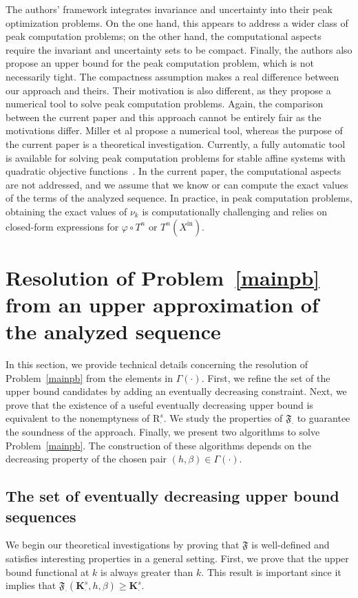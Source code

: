 \documentclass{article}
\def\funset{\Gamma}
\def\rr{\mathbb R}
\def\nn{\mathbb N}
\def\xin{X^\mathrm{in}}
\def\bigks{\mathbf{K}^s}
\def\gls#1{{\mathrm R}_{#1}}
\def\gsls#1{\gls{#1}^s}
\def\blue#1{#1}
\begin{document}
\blue{	
The authors' framework integrates invariance and uncertainty into their peak optimization problems. On the one hand, this appears to address a wider class of peak computation problems; on the other hand, the computational aspects require the invariant and uncertainty sets to be compact. Finally, the authors also propose an upper bound for the peak computation problem, which is not necessarily tight. The compactness assumption makes a real difference between our approach and theirs. Their motivation is also different, as they propose a numerical tool to solve peak computation problems.  
Again, the comparison between the current paper and this approach cannot be entirely fair as the motivations differ. Miller et al propose a numerical tool, whereas the purpose of the current paper is a theoretical investigation. Currently, a fully automatic tool is available for solving peak computation problems for stable affine systems with quadratic objective functions~\cite{adje13052025}. In the current paper, the computational aspects are not addressed, and we assume that we know or can compute the exact values of the terms of the analyzed sequence. In practice, in peak computation problems, obtaining the exact values of $\nu_k$ is computationally challenging and relies on closed-form expressions for $\varphi\circ T^n$ or $T^n(\xin)$.
}
	
	
	\section{Resolution of Problem~\ref{mainpb} from an upper approximation of the analyzed sequence}
	\label{mainres}
	\blue{
	In this section, we provide technical details concerning the resolution of Problem~\ref{mainpb} from the elements in $\funset(\cdot)$. First, we refine the set of the upper bound candidates by adding an eventually decreasing constraint. Next, we prove that the existence of a useful eventually decreasing upper bound is equivalent to the nonemptyness of $\gsls{\cdot}$. We study the properties of $\mathfrak{F}_{\cdot}$ to guarantee the soundness of the approach. Finally, we present \blue{two} algorithms to solve Problem~\ref{mainpb}. The construction of these algorithms depends on the decreasing property of the chosen pair $(h,\beta)\in\funset(\cdot)$. 
	}
	\subsection{\blue{The set of eventually decreasing upper bound sequences}}	
	\blue{
	We begin our theoretical investigations by proving that $\mathfrak{F}$ is well-defined and satisfies interesting properties in a general setting. First, we prove that the upper bound functional at $k$ is always greater than $k$. This result is important since it implies that $\mathfrak{F}_{\cdot}(\bigks_{\cdot},h,\beta)\geq \bigks_{\cdot}$. 
	}
	
\end{document}
